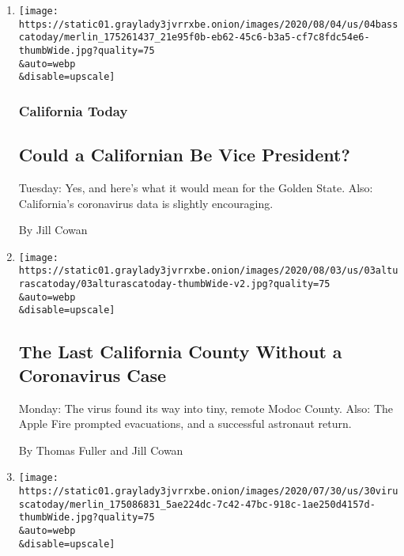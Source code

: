 \begin{enumerate}
\def\labelenumi{\arabic{enumi}.}
\item
  \href{/2020/08/04/us/biden-vp-karen-bass-kamala-harris.html}{}

  \texttt{[image: https://static01.graylady3jvrrxbe.onion/images/2020/08/04/us/04basscatoday/merlin\_175261437\_21e95f0b-eb62-45c6-b3a5-cf7c8fdc54e6-thumbWide.jpg?quality=75\\\&auto=webp\\\&disable=upscale]}

  \hypertarget{california-today}{%
  \subsubsection{California Today}\label{california-today}}

  \hypertarget{could-a-californian-be-vice-president}{%
  \subsection{Could a Californian Be Vice
  President?}\label{could-a-californian-be-vice-president}}

  Tuesday: Yes, and here's what it would mean for the Golden State.
  Also: California's coronavirus data is slightly encouraging.

  By Jill Cowan
\item
  \href{/2020/08/03/us/california-coronavirus-modoc-county.html}{}

  \texttt{[image: https://static01.graylady3jvrrxbe.onion/images/2020/08/03/us/03alturascatoday/03alturascatoday-thumbWide-v2.jpg?quality=75\\\&auto=webp\\\&disable=upscale]}

  \hypertarget{the-last-california-county-without-a-coronavirus-case}{%
  \subsection{The Last California County Without a Coronavirus
  Case}\label{the-last-california-county-without-a-coronavirus-case}}

  Monday: The virus found its way into tiny, remote Modoc County. Also:
  The Apple Fire prompted evacuations, and a successful astronaut
  return.

  By Thomas Fuller and Jill Cowan
\item
  \href{/2020/07/30/us/coronavirus-california-health-equity.html}{}

  \texttt{[image: https://static01.graylady3jvrrxbe.onion/images/2020/07/30/us/30viruscatoday/merlin\_175086831\_5ae224dc-7c42-47bc-918c-1ae250d4157d-thumbWide.jpg?quality=75\\\&auto=webp\\\&disable=upscale]}


\end{enumerate}
